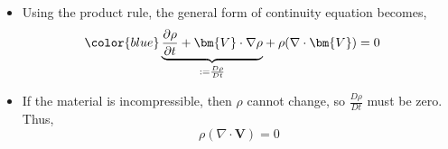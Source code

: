 \begin{itemize}
    \begin{itemize}
        \item Using the product rule, the general form of continuity equation becomes,
        \begin{align*}
            {\color{blue}\underbrace{\frac{\partial \rho}{\partial t} + \bm{V}\cdot \nabla \rho}_{:=\frac{D\rho}{Dt}}} + \rho (\nabla \cdot \bm{V}) &= 0
        \end{align*}
        \item If the material is incompressible, then $\rho$ cannot change, so $\frac{D\rho}{Dt}$ must be zero. Thus,
        \begin{equation*}
            \rho (\nabla \cdot \bm{V}) = 0
        \end{equation*}
    \end{itemize}
\end{itemize}



